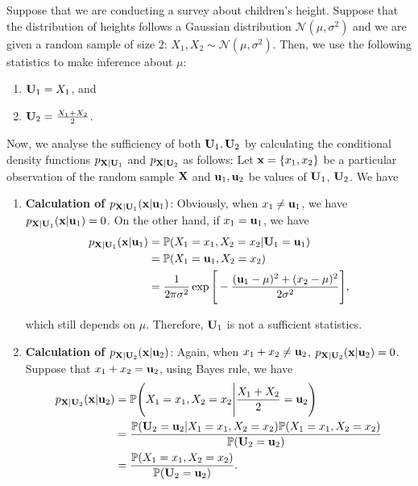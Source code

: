 \begin{example}
    Suppose that we are conducting a survey about children's height. Suppose that the distribution of heights follows a Gaussian distribution $\mathcal{N}(\mu, \sigma^2)$ and we are given a random sample of size $2$: $X_1, X_2\sim \mathcal{N}(\mu, \sigma^2)$. Then, we use the following statistics to make inference about $\mu$:
    \begin{enumerate}[label=(\roman*)]
        \item ${\bf U}_1=X_1$, and
        \item ${\bf U}_2=\frac{X_1 + X_2}{2}$. 
    \end{enumerate} 

    \noindent Now, we analyse the sufficiency of both ${\bf U}_1, {\bf U}_2$ by calculating the conditional density functions $p_{{\bf X}|{\bf U}_1}$ and $p_{{\bf X}|{\bf U}_2}$ as follows: Let ${\bf x}=\{x_1, x_2 \}$ be a particular observation of the random sample ${\bf X}$ and ${\bf u}_1, {\bf u}_2$ be values of ${\bf U}_1$, ${\bf U}_2$. We have

    \begin{enumerate}[label=(\roman*)]
        \item \textbf{Calculation of $p_{{\bf X}|{\bf U}_1}({\bf x}|{\bf u}_1)$}: Obviously, when $x_1\ne{\bf u}_1$, we have $p_{{\bf X}|{\bf U}_1}({\bf x}|{\bf u}_1) = 0$. On the other hand, if $x_1={\bf u}_1$, we have
        \begin{align*}
            p_{{\bf X}|{\bf U}_1}({\bf x}|{\bf u}_1) &= \mathbb{P}(X_1=x_1, X_2=x_2|{\bf U}_1={\bf u}_1) \\
                &= \mathbb{P}(X_1 = {\bf u}_1, X_2 = x_2) \\
                &= \frac{1}{2\pi\sigma^2}\exp\Bigg[ 
                    -\frac{({\bf u}_1 - \mu)^2 + (x_2 - \mu)^2}{2\sigma^2}
                 \Bigg],
        \end{align*}

        \noindent which still depends on $\mu$. Therefore, ${\bf U}_1$ is not a sufficient statistics. 


        \item \textbf{Calculation of $p_{{\bf X}|{\bf U}_2}({\bf x}|{\bf u}_2)$}: Again, when $x_1+x_2\ne {\bf u}_2$, $p_{{\bf X}|{\bf U}_2}({\bf x}|{\bf u}_2)=0$. Suppose that $x_1+x_2={\bf u}_2$, using Bayes rule, we have
        \begin{align*}
            p_{{\bf X}|{\bf U}_2}({\bf x}|{\bf u}_2) &= \mathbb{P}\Bigg( X_1=x_1, X_2=x_2\Bigg|\frac{X_1 + X_2}{2} = {\bf u}_2 \Bigg) \\
            &= \frac{\mathbb{P}({\bf U}_2={\bf u}_2|X_1=x_1, X_2=x_2)\mathbb{P}(X_1=x_1, X_2=x_2)}{\mathbb{P}({\bf U}_2 = {\bf u}_2)} \\
            &= \frac{\mathbb{P}(X_1=x_1, X_2=x_2)}{\mathbb{P}({\bf U}_2={\bf u}_2)}.
        \end{align*} 


\end{enumerate}
\end{example}
